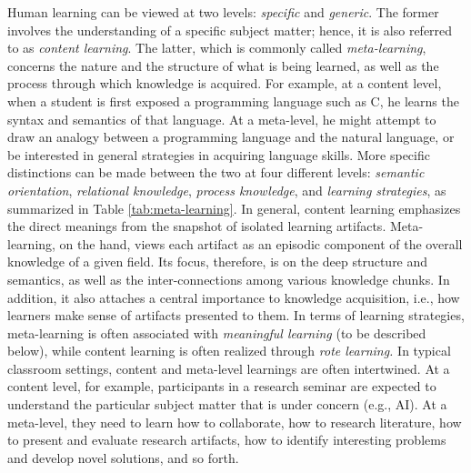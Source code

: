 Human learning can be viewed at two levels: {\it specific\/} and {\it
generic\/}. The former involves the understanding of a specific subject
matter; hence, it is also referred to as {\it content learning\/}. The
latter, which is commonly called {\it meta-learning\/}, concerns the nature
and the structure of what is being learned, as well as the process through
which knowledge is acquired. For example, at a content level, when a
student is first exposed a programming language such as C, he learns the
syntax and semantics of that language. At a meta-level, he might attempt to
draw an analogy between a programming language and the natural language, or
be interested in general strategies in acquiring language skills.  More
specific distinctions can be made between the two at four different levels:
{\it semantic orientation\/}, {\it relational knowledge\/}, {\it process
knowledge\/}, and {\it learning strategies\/}, as summarized in Table
\ref{tab:meta-learning}.  In general, content learning emphasizes the
direct meanings from the snapshot of isolated learning artifacts.
Meta-learning, on the hand, views each artifact as an episodic component of
the overall knowledge of a given field. Its focus, therefore, is on the
deep structure and semantics, as well as the inter-connections among
various knowledge chunks. In addition, it also attaches a central
importance to knowledge acquisition, i.e., how learners make sense of
artifacts presented to them.  In terms of learning strategies,
meta-learning is often associated with {\it meaningful learning\/} (to be
described below), while content learning is often realized through {\it rote
learning.\/}  In typical classroom settings, content and meta-level
learnings are often intertwined.  At a content level, for example,
participants in a research seminar are expected to understand the
particular subject matter that is under concern (e.g., AI). At a
meta-level, they need to learn how to collaborate, how to research
literature, how to present and evaluate research artifacts, how to identify
interesting problems and develop novel solutions, and so forth.

